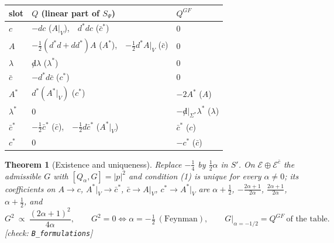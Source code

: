 \documentclass[11pt]{article}
\theoremstyle{plain}
\newtheorem{theorem}{Theorem}[section]
\theoremstyle{definition}
\numberwithin{equation}{section}
\begin{document}
\begin{tabular}{l|l|l}
\toprule
slot & $Q$ (linear part of $S_\Psi$) & $Q^{GF}$ \\
\midrule
$c$ & $-dc$ ($A|_V$),\ \ $d^*dc$ ($\bar c^*$) & $0$ \\
$A$ & $-\tfrac12(d^*d+dd^*)A$ ($A^*$),\ \ $-\tfrac12d^*A|_V$ ($\bar c$) & $0$ \\
$\lambda$ & ${\not d}\lambda$ ($\lambda^*$) & $0$ \\
$\bar c$ & $-d^*d\bar c$ ($c^*$) & $0$ \\
$A^*$ & $d^*(A^*|_V)$ ($c^*$) & $-2A^*$ ($A$) \\
$\lambda^*$ & $0$ & $-{\not d}|_{\Sigma^*}\lambda^*$ ($\lambda$) \\
$\bar c^*$ & $-\tfrac12\bar c^*$ ($\bar c$),\ \ $-\tfrac12d\bar c^*$ ($A^*|_V$) & $\bar c^*$ ($c$) \\
$c^*$ & $0$ & $-c^*$ ($\bar c$) \\
\bottomrule
\end{tabular}

\begin{theorem}[Existence and uniqueness]
\label{thm:uniqA}
Replace $-\tfrac14$ by $\tfrac12\alpha$ in $S'$. On $\mathscr E\oplus\mathscr E^{\bar c}$ the admissible $G$ with $[Q_\alpha,G]=|p|^2$ and condition (1) is unique for every $\alpha\neq0$; its coefficients on $A\to c$, $A^*|_V\to\bar c^*$, $\bar c\to A|_V$, $c^*\to A^*|_V$ are $\alpha+\tfrac12$, $-\tfrac{2\alpha+1}{2\alpha}$, $\tfrac{2\alpha+1}{2\alpha}$, $\alpha+\tfrac12$, and
\[
G^2\ \propto\ \frac{(2\alpha+1)^2}{4\alpha},\qquad G^2=0\iff\alpha=-\tfrac12\ (\text{Feynman}),\qquad G|_{\alpha=-1/2}=Q^{GF}\ \text{of the table}.
\]
[check: \texttt{B\_formulations}]
\end{theorem}
\end{document}
